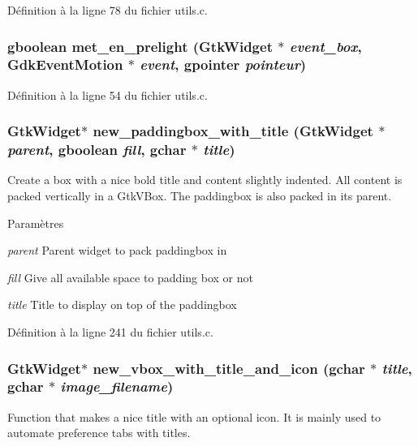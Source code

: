 Définition à la ligne 78 du fichier utils.c.

\subsubsection[{met\_\-en\_\-prelight}]{\setlength{\rightskip}{0pt plus 5cm}gboolean met\_\-en\_\-prelight (GtkWidget $\ast$ {\em event\_\-box}, \/  GdkEventMotion $\ast$ {\em event}, \/  gpointer {\em pointeur})}\label{utils_8c_abd40f595e7f75784d5151abd80a35af7}


Définition à la ligne 54 du fichier utils.c.

\subsubsection[{new\_\-paddingbox\_\-with\_\-title}]{\setlength{\rightskip}{0pt plus 5cm}GtkWidget$\ast$ new\_\-paddingbox\_\-with\_\-title (GtkWidget $\ast$ {\em parent}, \/  gboolean {\em fill}, \/  gchar $\ast$ {\em title})}\label{utils_8c_a22ba81fcf046b5bec6cf6d55d440abc5}
Create a box with a nice bold title and content slightly indented. All content is packed vertically in a GtkVBox. The paddingbox is also packed in its parent.


\begin{DoxyParams}{Paramètres}
\item[{\em parent}]Parent widget to pack paddingbox in \item[{\em fill}]Give all available space to padding box or not \item[{\em title}]Title to display on top of the paddingbox \end{DoxyParams}


Définition à la ligne 241 du fichier utils.c.

\subsubsection[{new\_\-vbox\_\-with\_\-title\_\-and\_\-icon}]{\setlength{\rightskip}{0pt plus 5cm}GtkWidget$\ast$ new\_\-vbox\_\-with\_\-title\_\-and\_\-icon (gchar $\ast$ {\em title}, \/  gchar $\ast$ {\em image\_\-filename})}\label{utils_8c_a3baab3fba6974f2ebf35757198ac8911}
Function that makes a nice title with an optional icon. It is mainly used to automate preference tabs with titles.


